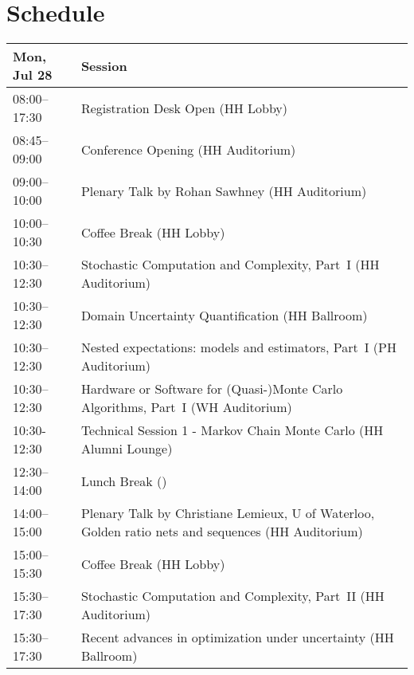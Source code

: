 \chapter{Schedule}
\begin{table}
{\footnotesize
\begin{tabularx}{\textwidth}{>{\hsize=0.32\hsize}X|>{\hsize=1.7\hsize}X}
\hline
\textbf{Mon, Jul 28} & \textbf{Session} \\
\hline
\cellcolor{\EmptyColor}08:00–17:30 & \cellcolor{\EmptyColor}Registration Desk Open (HH Lobby) \\
\cellcolor{\PlenaryColor}08:45–09:00 & \cellcolor{\PlenaryColor}Conference Opening (HH Auditorium) \\
\cellcolor{\PlenaryColor}09:00–10:00 & \cellcolor{\PlenaryColor}Plenary Talk by Rohan Sawhney (HH Auditorium) \\
\cellcolor{\EmptyColor}10:00–10:30 & \cellcolor{\EmptyColor}Coffee Break (HH Lobby) \\
\cellcolor{\SessionTitleColor}10:30–12:30 & \cellcolor{\SessionTitleColor}Stochastic Computation and Complexity, Part~I (HH Auditorium) \\
\cellcolor{\SessionTitleColor}10:30–12:30 & \cellcolor{\SessionTitleColor}Domain Uncertainty Quantification (HH Ballroom) \\
\cellcolor{\SessionTitleColor}10:30–12:30 & \cellcolor{\SessionTitleColor}Nested expectations: models and estimators, Part~I (PH Auditorium) \\
\cellcolor{\SessionTitleColor}10:30–12:30 & \cellcolor{\SessionTitleColor}Hardware or Software for (Quasi-)Monte Carlo Algorithms, Part~I (WH Auditorium) \\
\cellcolor{\SessionLightColor}10:30-12:30 & \cellcolor{\SessionLightColor}Technical Session 1 - Markov Chain Monte Carlo (HH Alumni Lounge) \\
\cellcolor{\EmptyColor}12:30–14:00 & \cellcolor{\EmptyColor}Lunch Break () \\
\cellcolor{\PlenaryColor}14:00–15:00 & \cellcolor{\PlenaryColor}Plenary Talk by Christiane Lemieux, U of Waterloo, Golden ratio nets and sequences (HH Auditorium) \\
\cellcolor{\EmptyColor}15:00–15:30 & \cellcolor{\EmptyColor}Coffee Break (HH Lobby) \\
\cellcolor{\SessionTitleColor}15:30–17:30 & \cellcolor{\SessionTitleColor}Stochastic Computation and Complexity, Part~II (HH Auditorium) \\
\cellcolor{\SessionTitleColor}15:30–17:30 & \cellcolor{\SessionTitleColor}Recent advances in optimization under uncertainty (HH Ballroom) \\

\end{tabularx}}
\end{table}
